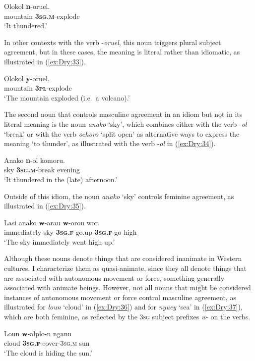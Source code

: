 \documentclass[output=collectionpaper]{langsci/langscibook}
\begin{document}
\ea \label{ex:Dry:32}
\gll Olokol	\textbf{n}-oruel.\\
mountain \textbf{\textsc{3sg.m}}-explode\\
\glt `It thundered.'
\z

In other contexts with the verb -\textit{oruel}, this noun triggers plural subject agreement, but in these cases, the meaning is literal rather than idiomatic, as illustrated in (\ref{ex:Dry:33}).

\ea \label{ex:Dry:33}
\gll Olokol	\textbf{y}-oruel.\\
mountain \textbf{\textsc{3pl}}-explode\\
\glt `The mountain exploded (i.e.\ a volcano).'
\z

The second noun that controls masculine agreement in an idiom but not in its literal meaning is the noun \textit{anako} `sky', which combines either with the verb -\textit{ol} `break' or with the verb \textit{ochoro} `split open' as alternative ways to express the meaning `to thunder', as illustrated with the verb -\textit{ol} in (\ref{ex:Dry:34}).

\ea \label{ex:Dry:34}
\gll Anako	\textbf{n}-ol	komoru.\\
sky \textbf{\textsc{3sg.m}}-break evening\\
\glt `It thundered in the (late) afternoon.'
\z

Outside of this idiom, the noun \textit{anako} `sky' controls feminine agreement, as illustrated in (\ref{ex:Dry:35}).

\ea \label{ex:Dry:35}
\gll Lasi	anako	\textbf{w}-arau	\textbf{w}-orou	wor.\\
immediately sky \textbf{\textsc{3sg.f}}-go.up \textbf{\textsc{3sg.f}}-go high\\
\glt `The sky immediately went high up.'
\z

Although these nouns denote things that are considered inanimate in Western cultures, I characterize them as quasi-animate, since they all denote things that are associated with autonomous movement or force, something generally associated with animate beings. However, not all nouns that might be considered instances of autonomous movement or force control masculine agreement, as illustrated for \textit{loun} `cloud' in (\ref{ex:Dry:36}) and for \textit{nyuey} `sea' in (\ref{ex:Dry:37}), which are both feminine, as reflected by the \textsc{3sg} subject prefixes \textit{w}{}- on the verbs.

\ea \label{ex:Dry:36}
\gll Loun	\textbf{w}-alplo-n	nganu\\
cloud \textbf{\textsc{3sg.f}}-cover-\textsc{3sg.m} sun\\
\glt `The cloud is hiding the sun.'
\z
\end{document}
